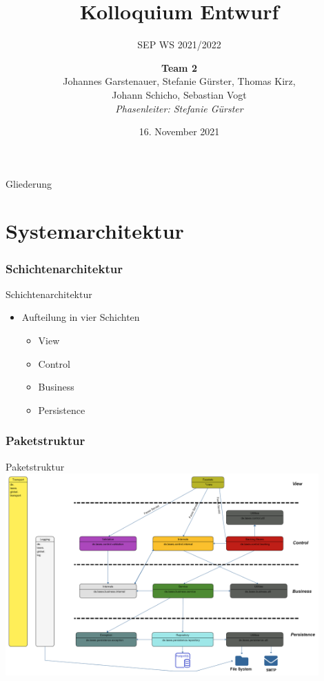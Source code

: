 \documentclass{beamer}
\title{Kolloquium Entwurf}
\subtitle{SEP WS 2021/2022}
\date{\small 16. November 2021}
\author{\textbf{Team 2} \\ \small {Johannes Garstenauer, Stefanie Gürster, Thomas Kirz,\\ Johann Schicho, Sebastian Vogt} \\ \vspace{0.5cm}\emph{Phasenleiter: Stefanie Gürster}\normalsize}
\begin{document}
    \begin{frame}
        \titlepage
    \end{frame}

    \begin{frame}{Gliederung}
        \tableofcontents
    \end{frame}

    \section{Systemarchitektur}

    \subsubsection{Schichtenarchitektur}
    \begin{frame}{Schichtenarchitektur}
        \begin{itemize}

            \item Aufteilung in vier Schichten
            \pause
            \begin{itemize}
                \item View
                \item Control
                \item Business
                \item Persistence
            \end{itemize}

        \end{itemize}
    \end{frame}

    \subsubsection{Paketstruktur}
    \begin{frame}{Paketstruktur}
        \centering
        \includegraphics[width=0.9\textwidth]{../../docs/Entwurf/graphics/Paketdiagramm9.0.png}
    \end{frame}
\end{document}
